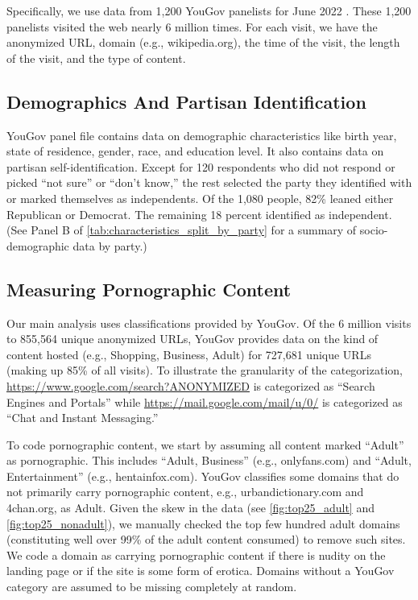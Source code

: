 \documentclass[12pt,twoside]{article}
\begin{document}
Specifically, we use data from 1,200 YouGov panelists for June 2022 \citep{data-dataverse}. These 1,200 panelists visited the web nearly 6 million times. For each visit, we have the anonymized URL, domain (e.g., wikipedia.org), the time of the visit, the length of the visit, and the type of content. 

\subsection{Demographics And Partisan Identification}
\label{subsec:demographics}
YouGov panel file contains data on demographic characteristics like birth year, state of residence, gender, race, and education level. It also contains data on partisan self-identification. Except for 120 respondents who did not respond or picked ``not sure'' or ``don't know,'' the rest selected the party they identified with or marked themselves as independents. Of the 1,080 people, 82\% leaned either Republican or Democrat. The remaining 18 percent identified as independent. (See Panel B of \cref{tab:characteristics_split_by_party} for a summary of socio-demographic data by party.)

\subsection{Measuring Pornographic Content}
\label{subsec:measuring_porn_content}

Our main analysis uses classifications provided by YouGov. Of the 6 million visits to 855,564 unique anonymized URLs, YouGov provides data on the kind of content hosted (e.g., Shopping, Business, Adult) for 727,681 unique URLs (making up 85\% of all visits). To illustrate the granularity of the categorization, \url{https://www.google.com/search?ANONYMIZED} is categorized as ``Search Engines and Portals'' while \url{https://mail.google.com/mail/u/0/} is categorized as ``Chat and Instant Messaging.'' 

To code pornographic content, we start by assuming all content marked ``Adult'' as pornographic. This includes ``Adult, Business'' (e.g., onlyfans.com) and ``Adult, Entertainment'' (e.g., hentainfox.com). YouGov classifies some domains that do not primarily carry pornographic content, e.g., urbandictionary.com and 4chan.org, as Adult. Given the skew in the data (see \cref{fig:top25_adult} and \cref{fig:top25_nonadult}), we manually checked the top few hundred adult domains (constituting well over 99\% of the adult content consumed) to remove such sites. We code a domain as carrying pornographic content if there is nudity on the landing page or if the site is some form of erotica. Domains without a YouGov category are assumed to be missing completely at random. 
\end{document}
